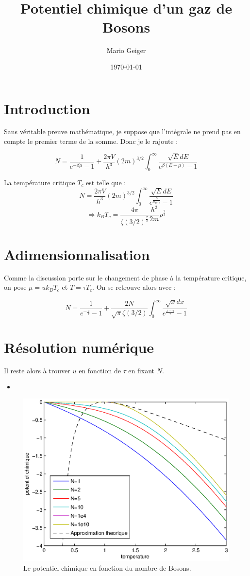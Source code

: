 \documentclass[a4paper,english]{article}
\newcommand{\matlabscript}[2]
  {\begin{itemize}\item[]\end{itemize}}
\begin{document}
\title{Potentiel chimique d'un gaz de Bosons}
\author{Mario Geiger}
\date{\today}
\maketitle

\section{Introduction}

Sans véritable preuve mathématique, je suppose que l'intégrale ne prend pas en compte le premier terme de la somme. Donc je le rajoute :

$$N = \frac{1}{e^{-\beta \mu} - 1} + \frac{2 \pi V}{h^3} (2m)^{3/2} \int_0^\infty \frac{\sqrt{E} dE}{e^{\beta(E-\mu)}-1}$$

La température critique $T_c$ est telle que : 
$$N = \frac{2 \pi V}{h^3} (2m)^{3/2} \int_0^\infty \frac{\sqrt{E} dE}{e^{\frac{E}{k_B T_c}}-1}$$
$$\Rightarrow k_B T_c = \frac{4 \pi}{\zeta(3/2)^\frac{2}{3}} \frac{\hbar^2}{2m} \rho^\frac{2}{3}$$

\section{Adimensionnalisation}

Comme la discussion porte sur le changement de phase à la température critique, on pose $\mu = u k_B T_c$ et $T = \tau T_c$. On se retrouve alors avec :

$$N = \frac{1}{e^{-\frac{u}{\tau}} -1 } + \frac{2N}{\sqrt{\pi} \zeta(3/2)} \int_0^\infty \frac{\sqrt{x} dx}{e^{\frac{x-u}{\tau}}-1}$$

\section{Résolution numérique}
Il reste alors à trouver $u$ en fonction de $\tau$ en fixant $N$.

\matlabscript{bose}{Code matlab}

\begin{figure}
	\centering
	\includegraphics{untitled.eps}
	\caption{Le potentiel chimique en fonction du nombre de Bosons.}
\end{figure}
\end{document}
